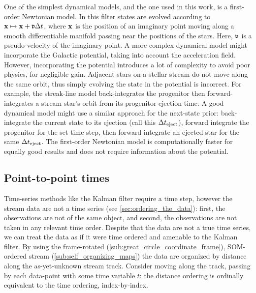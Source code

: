\documentclass[fleqn,usenatbib]{mnras}
\begin{document}
    One of the simplest dynamical models, and the one used in this work, is a
    first-order Newtonian model. In this filter states are evolved according to
    $\mathbf{x} \mapsto \mathbf{x} + \mathfrak{v} \Delta t$, where $\mathbf{x}$ is the
    position of an imaginary point moving along a smooth differentiable manifold
    passing near the positions of the stars. Here, $\mathfrak{v}$ is a
    pseudo-velocity of the imaginary point. A more complex dynamical model might
    incorporate the Galactic potential, taking into account the acceleration
    field. However, incorporating the potential introduces a lot of complexity
    to avoid poor physics, for negligible gain. Adjacent stars on a stellar
    stream do not move along the same orbit, thus simply evolving the state in
    the potential is incorrect. For example, the streak-line model
    \citep{Kupper2012} back-integrates the progenitor then forward-integrates a
    stream star's orbit from its progenitor ejection time. A good dynamical
    model might use a similar approach for the next-state prior: back-integrate
    the current state to its ejection (call this $\Delta t_{\rm{eject}}$),
    forward integrate the progenitor for the set time step, then forward
    integrate an ejected star for the same $\Delta t_{\rm{eject}}$. The
    first-order Newtonian model is computationally faster for equally good
    results and does not require information about the potential.

  \subsection{Point-to-point times} \label{sub:distances_as_times}

    Time-series methods like the Kalman filter require a time step, however the
    stream data are not a time series (see \autoref{sec:ordering_the_data}):
    first, the observations are not of the same object, and second, the
    observations are not taken in any relevant time order. Despite that the data
    are not a true time series, we can treat the data as if it were time ordered
    and amenable to the Kalman filter. By using the frame-rotated
    (\autoref{sub:great_circle_coordinate_frame}), SOM-ordered stream
    (\ref{sub:self_organizing_maps}) the data are organized by distance along
    the as-yet-unknown stream track. Consider moving along the track, passing by
    each data-point with some time variable $t$: the distance ordering is
    ordinally equivalent to the time ordering, index-by-index.
\end{document}
